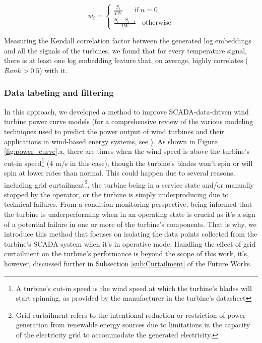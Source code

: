     \begin{equation}
      w_i = \begin{cases}
        \frac{S_i}{TW}\ \ \ \ \ \ \ \ \text{if}\ n = 0\\
        \frac{S_i - S_{i-1}}{TW}\ \ \ \ \text{otherwise}
      \end{cases}
    \end{equation}


    Measuring the Kendall correlation factor between the generated log embeddings and all the signals of the turbines, we found that for every temperature signal, there is at least 
    one log embedding feature that, on average, highly correlates ($Rank>0.5$) with it.

    

    \subsubsection{Data labeling and filtering}
    \label{subsub:PC}
      In this approach, we developed a method to improve SCADA-data-driven wind turbine power curve models 
      (for a comprehensive review of the various modeling techniques used to predict the power output of wind turbines and their applications in wind-based energy systems, 
      see \cite{Power_curves}). As shown in Figure \ref{fig:power_curve}.a, there are times when 
      the wind speed is above the turbine's cut-in speed\footnote{A turbine's cut-in speed is the wind speed at which the turbine's blades will start spinning, 
      as provided by the manufacturer in the turbine's datasheet} (4 m/s in this case), though the turbine's blades won't spin or will spin at lower rates than 
      normal. This could happen due to several reasons, including grid curtailment\footnote{Grid curtailment refers to the intentional reduction or restriction of power 
      generation from renewable energy sources due to limitations in the capacity of the electricity grid to accommodate the generated electricity.}, 
      the turbine being in a service state and/or manually stopped by the operator, or the turbine is simply underproducing due to technical failures.
      From a condition monitoring perspective, being informed that the turbine is underperforming when in an operating state is crucial as it's a sign 
      of a potential failure in one or more of the turbine's components. That is why, we introduce this method that focuses on isolating the data points collected 
      from the turbine's SCADA system when it's in operative mode. Handling the effect of grid curtailment on the turbine's performance is beyond
      the scope of this work, it's, however, discussed further in Subsection \ref{sub:Curtailment} of the Future Works.\\
      
